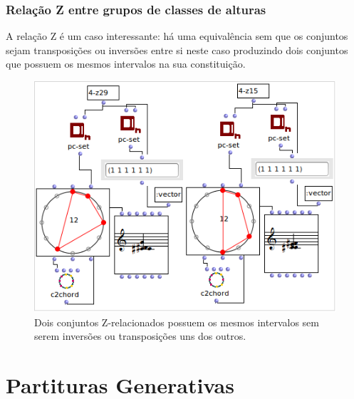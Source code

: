 \documentclass[
	12pt,				%
	openright,			%
	twoside,			%
	a4paper,			%
	english,			%
	french,				%
	spanish,			%
	brazil				%
	]{abntex2}
\begin{document}
\begin{apendicesenv}
\subsection{Relação Z entre grupos de classes de alturas}

A relação Z é um caso interessante: há uma equivalência sem que os conjuntos sejam transposições ou inversões entre si neste caso produzindo dois conjuntos que possuem os mesmos intervalos na sua constituição.


\begin{figure}[!h]
	\caption{\label{fig_grafico}Dois conjuntos Z-relacionados possuem os mesmos intervalos sem serem inversões ou transposições uns dos outros. }
	\begin{center}
	    \includegraphics[scale=0.6]{OM_settheory/Z_related.png}
	\end{center}
\end{figure}

\end{apendicesenv}

\chapter{Partituras Generativas}
%
\end{document}
